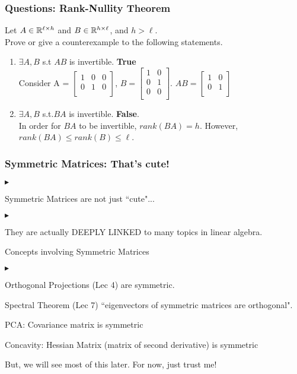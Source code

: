 \documentclass{beamer}
\renewenvironment{itemize}
\renewenvironment{enumerate}%
{\begin{list}{\arabic{enumi}.}%
      {\setlength{\leftmargin}{2.5em}%
       \setlength{\itemsep}{-\parsep}%
       \setlength{\topsep}{-\parskip}%
       \usecounter{enumi}}%
 }{\end{list}}
\renewenvironment{itemize}%
{\begin{list}{$\blacktriangleright$}%
      {\setlength{\leftmargin}{2.5em}%
       \setlength{\itemsep}{-\parsep}%
       \setlength{\topsep}{-\parskip}%
       \usecounter{enumi}}%
 }{\end{list}}
\begin{document}
\begin{frame}
\frametitle{Questions: Rank-Nullity Theorem}
Let $A\in \mathbb{R}^{\ell\times h}$ and $B\in \mathbb{R}^{h\times \ell}$, and $h>\ell$.\\
Prove or give a counterexample to the following statements.
\begin{solution}
\begin{enumerate}
\item $\exists A,B$ s.t $AB$ is invertible.
 \textbf{True}\\
Consider 
A = $\begin{bmatrix}
1 & 0 & 0 \\
0 & 1 & 0 \\
\end{bmatrix}$, $
B = \begin{bmatrix}
1 & 0 \\
0 & 1 \\
0 & 0 \\
\end{bmatrix}$. 
$AB= \begin{bmatrix}
1 & 0 \\
0 & 1 \\
\end{bmatrix}$ 
\medskip
\item $\exists A,B$ s.t.$BA$ is invertible.
\textbf{False}.\\
In order for $BA$ to be invertible, $rank(BA)=h$. However, $rank(BA) \leq rank(B)\leq \ell $.
\end{enumerate}
\end{solution}
\end{frame}


\begin{frame}
\frametitle{Symmetric Matrices: That's cute!}
\begin{itemize}

\item Symmetric Matrices are not just ``cute"...\\
	\begin{itemize}
	\item They are actually DEEPLY LINKED to many topics in linear algebra.\\
	\end{itemize}
\item Concepts involving Symmetric Matrices
\begin{itemize}
\item Orthogonal Projections (Lec 4) are symmetric.\\
\item Spectral Theorem (Lec 7) ``eigenvectors of symmetric matrices are orthogonal".\\
\item PCA: Covariance matrix is symmetric
\item Concavity: Hessian Matrix (matrix of second derivative) is symmetric
\end{itemize}
\item But, we will see most of this later. For now, just trust me!
\end{itemize}
\end{frame}
\end{document}
